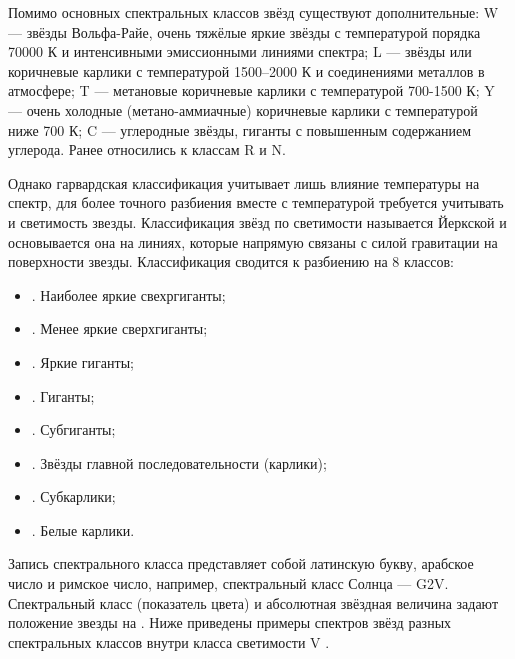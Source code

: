 Помимо основных спектральных классов звёзд существуют дополнительные: W — звёзды Вольфа-Райе, очень тяжёлые яркие звёзды с температурой порядка 70000 К и интенсивными эмиссионными линиями спектра; L — звёзды или коричневые карлики с температурой 1500–2000 К и соединениями металлов в атмосфере; T — метановые коричневые карлики с температурой 700-1500 К; Y — очень холодные (метано-аммиачные) коричневые карлики с температурой ниже 700 К; C — углеродные звёзды, гиганты с повышенным содержанием углерода. Ранее относились к классам R и N.

Однако гарвардская классификация учитывает лишь влияние температуры на спектр, для более точного разбиения вместе с температурой требуется учитывать и светимость звезды. Классификация звёзд по светимости называется Йеркской и основывается она на линиях, которые напрямую связаны с силой гравитации на поверхности звезды. Классификация сводится к разбиению на 8 классов:
\begin{itemize}
	\item {}. Наиболее яркие свехргиганты;
	\item {}. Менее яркие сверхгиганты;
	\item {}. Яркие гиганты;
	\item {}. Гиганты;
	\item {}. Субгиганты;
	\item {}. Звёзды главной последовательности (карлики);
	\item {}. Субкарлики;
	\item {}. Белые карлики.
\end{itemize}
Запись спектрального класса представляет собой латинскую букву, арабское число и римское число, например, спектральный класс Солнца — G2V. Спектральный класс (показатель цвета) и абсолютная звёздная величина задают положение звезды на . Ниже приведены примеры спектров звёзд разных спектральных классов внутри класса светимости V .
